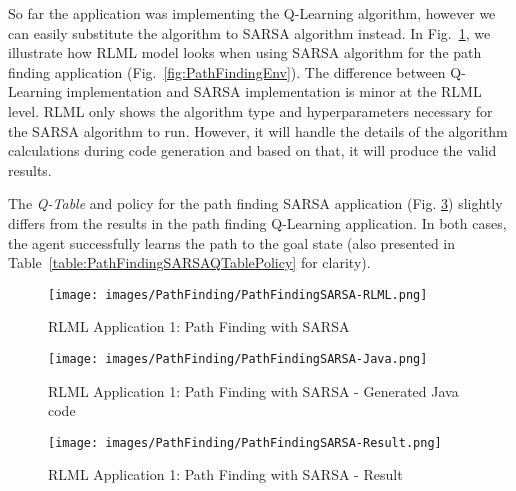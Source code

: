 \documentclass[11pt,letterpaper]{ryersonSGSThesis}
\begin{document}
\begin{ryersonSGSThesis}
    So far the application was implementing the Q-Learning algorithm, however we can easily substitute the algorithm to SARSA algorithm instead. In Fig.~\ref{fig:PathFindingSARSARLML}, we illustrate how RLML model looks when using SARSA algorithm for the path finding application (Fig.~\ref{fig:PathFindingEnv}). The difference between Q-Learning implementation and SARSA implementation is minor at the RLML level. RLML only shows the algorithm type and hyperparameters necessary for the SARSA algorithm to run. However, it will handle the details of the algorithm calculations during code generation and based on that, it will produce the valid results. 
    
    The \emph{Q-Table} and policy for the path finding SARSA application (Fig. \ref{fig:PathFindingSARSAResult}) slightly differs from the results in the path finding Q-Learning application. In both cases, the agent successfully learns the path to the goal state (also presented in Table~\ref{table:PathFindingSARSAQTablePolicy} for clarity). 

    \begin{figure}[!tbh]
        \centering
        \texttt{[image: images/PathFinding/PathFindingSARSA-RLML.png]}
        \caption{RLML Application 1: Path Finding with SARSA}
        \label{fig:PathFindingSARSARLML}
    \end{figure}
    
    \begin{figure}[!tbh]
        \centering
        \texttt{[image: images/PathFinding/PathFindingSARSA-Java.png]}
        \caption{RLML Application 1: Path Finding with SARSA  - Generated Java code}
        \label{fig:PathFindingSARSAJava}
    \end{figure}
    
    \begin{figure}[!tbh]
        \centering
        \texttt{[image: images/PathFinding/PathFindingSARSA-Result.png]}
        \caption{RLML Application 1: Path Finding with SARSA - Result}
        \label{fig:PathFindingSARSAResult}
    \end{figure}
    

\end{ryersonSGSThesis}
\end{document}
